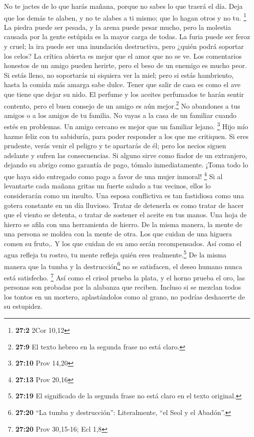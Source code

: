  No te jactes de lo que harás mañana, porque no sabes lo
que traerá el día.  Deja que los demás te alaben, y no te
alabes a ti mismo; que lo hagan otros y no tu. \footnote{\textbf{27:2}
  2Cor 10,12}  La piedra puede ser pesada, y la arena
puede pesar mucho, pero la molestia causada por la gente estúpida es la
mayor carga de todas.  La furia puede ser feroz y cruel;
la ira puede ser una inundación destructiva, pero ¿quién podrá soportar
los celos?  La crítica abierta es mejor que el amor que no
se ve.  Los comentarios honestos de un amigo pueden
herirte, pero el beso de un enemigo es mucho peor.  Si
estás lleno, no soportarás ni siquiera ver la miel; pero si estás
hambriento, hasta la comida más amarga sabe dulce.  Tener
que salir de casa es como el ave que tiene que dejar su nido.
 El perfume y los aceites perfumados te harán sentir
contento, pero el buen consejo de un amigo es aún mejor.\footnote{\textbf{27:9}
  El texto hebreo en la segunda frase no está claro.}  No
abandones a tus amigos o a los amigos de tu familia. No vayas a la casa
de un familiar cuando estés en problemas. Un amigo cercano es mejor que
un familiar lejano. \footnote{\textbf{27:10} Prov 14,20} 
Hijo mío hazme feliz con tu sabiduría, para poder responder a los que me
critiquen.  Si eres prudente, verás venir el peligro y te
apartarás de él; pero los necios siguen adelante y sufren las
consecuencias.  Si alguno sirve como fiador de un
extranjero, dejando su abrigo como garantía de pago, tómalo
inmediatamente. ¡Toma todo lo que haya sido entregado como pago a favor
de una mujer inmoral! \footnote{\textbf{27:13} Prov 20,16}
 Si al levantarte cada mañana gritas un fuerte saludo a
tus vecinos, ellos lo considerarán como un insulto.  Una
esposa conflictiva es tan fastidiosa como una gotera constante en un día
lluvioso.  Tratar de detenerla es como tratar de hacer
que el viento se detenta, o tratar de sostener el aceite en tus manos.
 Una hoja de hierro se afila con una herramienta de
hierro. De la misma manera, la mente de una persona se moldea con la
mente de otra.  Los que cuidan de una higuera comen su
fruto,. Y los que cuidan de su amo serán recompensados. 
Así como el agua refleja tu rostro, tu mente refleja quién eres
realmente.\footnote{\textbf{27:19} El significado de la segunda frase no
  está claro en el texto original.}  De la misma manera
que la tumba y la destrucción\footnote{\textbf{27:20} ``La tumba y
  destrucción'': Literalmente, ``el Seol y el Abadón''.} no se
satisfacen, el deseo humano nunca está satisfecho. \footnote{\textbf{27:20}
  Prov 30,15-16; Ecl 1,8}  Así como el crisol prueba la
plata, y el horno prueba el oro, las personas son probadas por la
alabanza que reciben.  Incluso si se mezclan todos los
tontos en un mortero, aplastándolos como al grano, no podrías deshacerte
de su estupidez.

